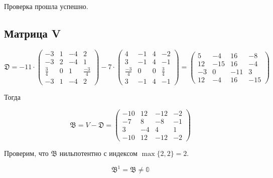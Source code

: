 \documentclass[12pt, a4paper]{article}
\begin{document}
    Проверка прошла успешно.

    


    \subsection{Матрица V}

    \begin{equation}
        \mathfrak{D} = -11 \cdot \left(\begin{matrix}
            -3 & 1 & -4 & 2 \\
            -3 & 2 & -4 & 1 \\
            \frac{3}{4} & 0 & 1 & \frac{-3}{4} \\
            -3 & 1 & -4 & 2
        \end{matrix}\right) - 7 \cdot \left(\begin{matrix}
            4 & -1 & 4 & -2 \\
            3 & -1 & 4 & -1 \\
            \frac{-3}{4} & 0 & 0 & \frac{3}{4} \\
            3 & -1 & 4 & -1
        \end{matrix}\right)  = \left(\begin{matrix}
            5 & -4 & 16 & -8 \\
            12 & -15 & 16 & -4 \\
            -3 & 0 & -11 & 3 \\
            12 & -4 & 16 & -15
        \end{matrix}\right)
    \end{equation}


    Тогда 

    \begin{equation}
        \mathfrak{B} = V - \mathfrak{D} = 
        \left(\begin{matrix}
            -10 & 12 & -12 & -2 \\
            -7 & 8 & -8 & -1 \\
            3 & -4 & 4 & 1 \\
            -10 & 12 & -12 & -2
        \end{matrix}\right)
    \end{equation}

    Проверим, что $\mathfrak{B}$ нильпотентно с индексом $\max\{2, 2\} = 2$.

    \begin{equation}
        \mathfrak{B}^1 = \mathfrak{B} \neq \mathbb{0}
    \end{equation}
\end{document}

